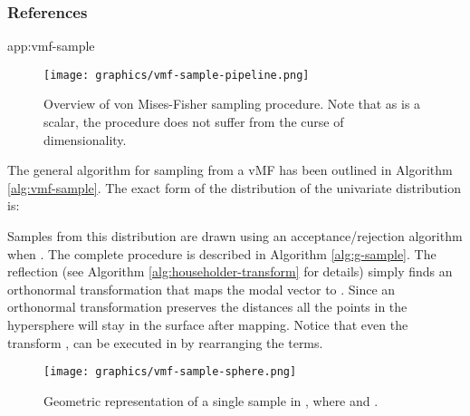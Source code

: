 \documentclass[letterpaper]{article}
\begin{document}
\subsubsection*{References}

\begingroup
\renewcommand{\section}[2]{}
 
\endgroup

\newpage
\newpage
\onecolumn

\appendix
\section{SAMPLING PROCEDURE} \label{app:vmf-sample}

\begin{figure}[H]\label{fig:sampling}
  \centering
  \texttt{[image: graphics/vmf-sample-pipeline.png]}
  \caption{Overview of von Mises-Fisher sampling procedure. Note that as  is a scalar, the procedure does not suffer from the curse of dimensionality.}
\end{figure}
 
The general algorithm for sampling from a vMF has been outlined in Algorithm \ref{alg:vmf-sample}. 
The exact form of the distribution of the univariate distribution  is:

Samples from this distribution are drawn using an acceptance/rejection algorithm when . The complete procedure is described in Algorithm \ref{alg:g-sample}. The  reflection (see Algorithm \ref{alg:householder-transform} for details) simply finds an orthonormal transformation that maps the modal vector  to . Since an orthonormal transformation preserves the distances all the points in the hypersphere will stay in the surface after mapping. Notice that even the transform , can be executed in  by rearranging the terms. 

\begin{figure}[H]\label{fig:sphere-sample-example}
  \centering
  \texttt{[image: graphics/vmf-sample-sphere.png]}
  \caption{Geometric representation of a single sample in , where  and .}
\end{figure}
\end{document}
